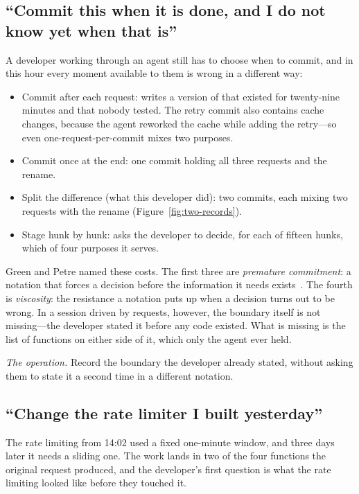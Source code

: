 \subsection{``Commit this when it is done, and I do not know yet when that is''}

A developer working through an agent still has to choose when to commit, and in
this hour every moment available to them is wrong in a different way:

\begin{itemize}
\item Commit after each request: writes a version of  that
  existed for twenty-nine minutes and that nobody tested. The retry commit
  also contains cache changes, because the agent reworked the cache while
  adding the retry---so even one-request-per-commit mixes two purposes.
\item Commit once at the end: one commit holding all three requests and the rename.
\item Split the difference (what this developer did): two commits, each mixing
  two requests with the rename (Figure~\ref{fig:two-records}).
\item Stage hunk by hunk: asks the developer to decide, for each of fifteen
  hunks, which of four purposes it serves.
\end{itemize}

\noindent Green and Petre named these costs. The first three are \emph{premature
commitment}: a notation that forces a decision before the information it needs
exists~\cite{green1996,blackwell2003}. The fourth is \emph{viscosity}: the
resistance a notation puts up when a decision turns out to be wrong. In
a session driven by requests, however, the boundary itself is not
missing---the developer stated it before any code existed. What is missing is
the list of functions on either side of it, which only the agent ever held.

\smallskip\noindent\emph{The operation.} Record the boundary the developer already
stated, without asking them to state it a second time in a different notation.

\subsection{``Change the rate limiter I built yesterday''}

The rate limiting from 14:02 used a fixed one-minute window, and three days later
it needs a sliding one. The work lands in two of the four functions the original
request produced, and the developer's first question is what the rate limiting
looked like before they touched it.

